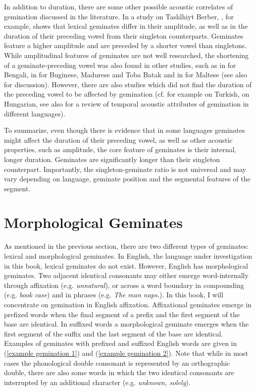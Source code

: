 In addition to duration, there are some other possible acoustic correlates of gemination discussed in the literature. In a study on Tashlhiyt Berber, \cite{Ridouane.2010}, for example, shows  that lexical geminates differ in their  amplitude, as well as in the duration of their preceding vowel from their singleton counterparts. Geminates feature a higher amplitude and are preceded by a shorter vowel than singletons. While amplitudinal features of geminates are not well researched,  the shortening of a geminate-preceding vowel was also found in other studies, such as in \cite{Lahiri.1988} for Bengali, in \cite{Cohn.1999} for Buginese, Madurese and Toba Batak and in  \cite{Galea.2016} for Maltese (see also \citealt{Maddieson.1985} for discussion). However, there are also studies which did not find the duration of the preceding vowel to be affected by gemination (cf. for example \citealt{Lahiri.1988} on Turkish, \citealt{Ham.2001} on Hungarian, see also \citealt[6]{Ridouane.2010} for a review of temporal acoustic attributes of gemination in different languages).

To summarize, even though there is evidence that in some languages geminates might affect the duration of their preceding vowel, as well as other acoustic properties, such as amplitude, the core feature of geminates is their internal, longer duration. Geminates are significantly longer than their singleton counterpart. Importantly, the singleton-geminate ratio is not universal and may vary depending on language, geminate position and the segmental features of the segment.



\section{Morphological Geminates}\label{Morphological Gemination}

As mentioned in the previous section, there are two different types of geminates: lexical and morphological geminates. In English, the language under investigation in this book, lexical geminates do not exist. However, English has morphological geminates. Two adjacent identical consonants may either emerge word-internally through affixation (e.g. \textit{unnatural}), or across a word boundary in compounding (e.g. \textit{book case}) and in phrases (e.g. \textit{The man naps.}). In this book, I will concentrate on gemination in English affixation. Affixational geminates emerge in prefixed words when the final segment of a prefix and the first segment of the base are identical. In suffixed words a morphological geminate emerges when the first segment of the suffix and the last segment of the base are identical. Examples of geminates with prefixed and suffixed English words are given in (\ref{example gemination 1}) and (\ref{example gemination 2}). Note that while in most cases the phonological double consonant is represented by an orthographic double, there are also some words in which the two identical consonants are interrupted by  an additional character (e.g. \textit{unknown, solely}).

